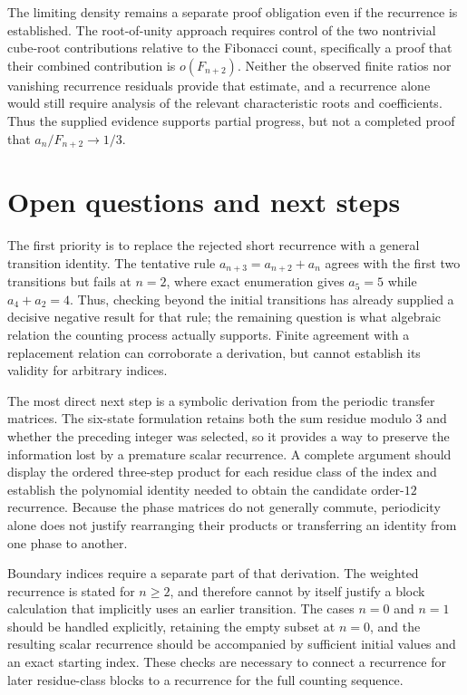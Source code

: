 \documentclass[11pt]{article}
\begin{document}
The limiting density remains a separate proof obligation even if the recurrence is established. The root-of-unity approach requires control of the two nontrivial cube-root contributions relative to the Fibonacci count, specifically a proof that their combined contribution is $o(F_{n+2})$. Neither the observed finite ratios nor vanishing recurrence residuals provide that estimate, and a recurrence alone would still require analysis of the relevant characteristic roots and coefficients. Thus the supplied evidence supports partial progress, but not a completed proof that $a_n/F_{n+2}\to 1/3$.

\section{Open questions and next steps}
The first priority is to replace the rejected short recurrence with a general transition identity. The tentative rule $a_{n+3}=a_{n+2}+a_n$ agrees with the first two transitions but fails at $n=2$, where exact enumeration gives $a_5=5$ while $a_4+a_2=4$. Thus, checking beyond the initial transitions has already supplied a decisive negative result for that rule; the remaining question is what algebraic relation the counting process actually supports. Finite agreement with a replacement relation can corroborate a derivation, but cannot establish its validity for arbitrary indices.

The most direct next step is a symbolic derivation from the periodic transfer matrices. The six-state formulation retains both the sum residue modulo $3$ and whether the preceding integer was selected, so it provides a way to preserve the information lost by a premature scalar recurrence. A complete argument should display the ordered three-step product for each residue class of the index and establish the polynomial identity needed to obtain the candidate order-$12$ recurrence. Because the phase matrices do not generally commute, periodicity alone does not justify rearranging their products or transferring an identity from one phase to another.

Boundary indices require a separate part of that derivation. The weighted recurrence is stated for $n\geq 2$, and therefore cannot by itself justify a block calculation that implicitly uses an earlier transition. The cases $n=0$ and $n=1$ should be handled explicitly, retaining the empty subset at $n=0$, and the resulting scalar recurrence should be accompanied by sufficient initial values and an exact starting index. These checks are necessary to connect a recurrence for later residue-class blocks to a recurrence for the full counting sequence.
\end{document}
